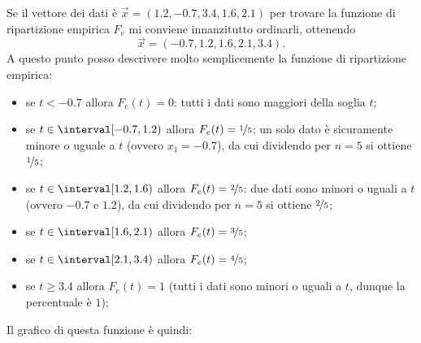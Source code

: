 \begin{example}
    Se il vettore dei dati è $\vec x = (1.2, -0.7, 3.4, 1.6, 2.1)$ per trovare la funzione di ripartizione empirica $F_e$ mi conviene innanzitutto ordinarli, ottenendo \[
        \vec x = (-0.7, 1.2, 1.6, 2.1, 3.4).    
    \] A questo punto posso descrivere molto semplicemente la funzione di ripartizione empirica:
    \begin{itemize}
        \item se $t < -0.7$ allora $F_e(t) = 0$: tutti i dati sono maggiori della soglia $t$;
        \item se $t \in \interval[{-0.7, 1.2})$ allora $F_e(t) = \nicefrac{1}{5}$: un solo dato è sicuramente minore o uguale a $t$ (ovvero $x_1 = -0.7$), da cui dividendo per $n = 5$ si ottiene $\nicefrac{1}{5}$;
        \item se $t \in \interval[{1.2, 1.6})$ allora $F_e(t) = \nicefrac{2}{5}$: due dati sono minori o uguali a $t$ (ovvero $-0.7$ e $1.2$), da cui dividendo per $n = 5$ si ottiene $\nicefrac{2}{5}$;
        \item se $t \in \interval[{1.6, 2.1})$ allora $F_e(t) = \nicefrac{3}{5}$;
        \item se $t \in \interval[{2.1, 3.4})$ allora $F_e(t) = \nicefrac{4}{5}$;
        \item se $t \geq 3.4$ allora $F_e(t) = 1$ (tutti i dati sono minori o uguali a $t$, dunque la percentuale è $1$);
    \end{itemize}

    Il grafico di questa funzione è quindi:
    \begin{center}
        

            
    \end{center}
\end{example}


